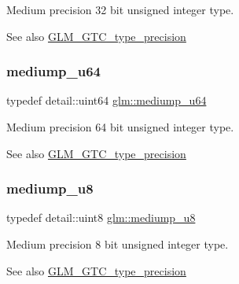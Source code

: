 Medium precision 32 bit unsigned integer type. \begin{DoxySeeAlso}{See also}
\hyperlink{group__gtc__type__precision}{G\+L\+M\+\_\+\+G\+T\+C\+\_\+type\+\_\+precision} 
\end{DoxySeeAlso}
\mbox{\label{group__gtc__type__precision_ga00c51a16fa190b0a90205d50d6d8a44a}} 
\subsubsection{\texorpdfstring{mediump\+\_\+u64}{mediump\_u64}}
{\footnotesize\ttfamily typedef detail\+::uint64 \hyperlink{group__gtc__type__precision_ga00c51a16fa190b0a90205d50d6d8a44a}{glm\+::mediump\+\_\+u64}}

Medium precision 64 bit unsigned integer type. \begin{DoxySeeAlso}{See also}
\hyperlink{group__gtc__type__precision}{G\+L\+M\+\_\+\+G\+T\+C\+\_\+type\+\_\+precision} 
\end{DoxySeeAlso}
\mbox{\label{group__gtc__type__precision_gac04b372784392e82bd557f300c4de097}} 
\subsubsection{\texorpdfstring{mediump\+\_\+u8}{mediump\_u8}}
{\footnotesize\ttfamily typedef detail\+::uint8 \hyperlink{group__gtc__type__precision_gac04b372784392e82bd557f300c4de097}{glm\+::mediump\+\_\+u8}}

Medium precision 8 bit unsigned integer type. \begin{DoxySeeAlso}{See also}
\hyperlink{group__gtc__type__precision}{G\+L\+M\+\_\+\+G\+T\+C\+\_\+type\+\_\+precision} 
\end{DoxySeeAlso}
\mbox{\label{group__gtc__type__precision_ga2cef3a0d7b0fce75c9885f64656d8933}} 
